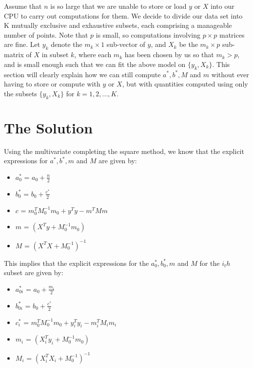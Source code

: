 \documentclass[
]{book}
\providecommand{\tightlist}{%
  \setlength{\itemsep}{0pt}\setlength{\parskip}{0pt}}
\theoremstyle{definition}
\theoremstyle{definition}
\theoremstyle{definition}
\theoremstyle{definition}
\theoremstyle{remark}
\begin{document}
Assume that \(n\) is so large that we are unable to store or load \(y\) or \(X\) into our CPU to carry out computations for them. We decide to divide our data set into K mutually exclusive and exhaustive subsets, each comprising a manageable number of points. Note that \(p\) is small, so computations involving \(p \times p\) matrices are fine. Let \(y_k\) denote the \(m_k \times 1\) sub-vector of \(y\), and \(X_k\) be the \(m_k \times p\) sub-matrix of \(X\) in subset \(k\), where each \(m_k\) has been chosen by us so that \(m_k > p\), and is small enough such that we can fit the above model on \(\{y_k, X_k\}\). This section will clearly explain how we can still compute \(a^*, b^*, M\) and \(m\) without ever having to store or compute with \(y\) or \(X\), but with quantities computed using only the subsets \(\{y_k, X_k\}\) for \(k = 1,2,...,K\).

\hypertarget{the-solution}{%
\section{The Solution}\label{the-solution}}

Using the multivariate completing the square method, we know that the explicit expressions for \(a^*, b^*, m\) and \(M\) are given by:

\begin{itemize}
\tightlist
\item
  \(a_0^*\) = \(a_0 + \frac{n}{2}\)\\
\item
  \(b_0^{*}\) = \(b_0 + \frac{c^*}{2}\)\\
\item
  \(c\) = \(m_0^{T}M^{-1}_0 m_0 + y^{T}y - m^{T}Mm\)\\
\item
  \(m\) = \((X^{T}y + M_0^{-1}m_0)\)\\
\item
  \(M\) = \((X^{T}X + M_0^{-1})^{-1}\)
\end{itemize}

This implies that the explicit expressions for the \(a_0^*, b_0^*, m\) and \(M\) for the \(i_th\) subset are given by:

\begin{itemize}
\tightlist
\item
  \(a_{0i}^*\) = \(a_0 + \frac{m_i}{2}\)\\
\item
  \(b_{0i}^{*}\) = \(b_0 + \frac{c^*}{2}\)\\
\item
  \(c_i^{*}\) = \(m_0^{T}M^{-1}_0 m_0 + y_i^{T}y_i - m_i^{T}M_im_i\)
\item
  \(m_i\) = \((X_i^{T}y_i + M_0^{-1}m_0)\)\\
\item
  \(M_i\) = \((X_i^{T}X_i + M_0^{-1})^{-1}\)
\end{itemize}
\end{document}
